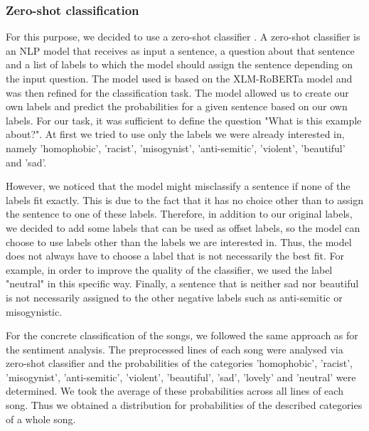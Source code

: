 \subsubsection*{Zero-shot classification}
For this purpose, we decided to use a zero-shot classifier \cite{zero-shot}. A zero-shot classifier is an NLP model that receives as input a sentence, a question about that sentence and a list of labels to which the model should assign the sentence depending on the input question. The model used is based on the XLM-RoBERTa model \cite{roberta} and was then refined for the classification task. The model allowed us to create our own labels and predict the probabilities for a given sentence based on our own labels. For our task, it was sufficient to define the question "What is this example about?". At first we tried to use only the labels we were already interested in, namely 'homophobic', 'racist', 'misogynist', 'anti-semitic', 'violent', 'beautiful' and 'sad'. 

However, we noticed that the model might misclassify a sentence if none of the labels fit exactly. This is due to the fact that it has no choice other than to assign the sentence to one of these labels. Therefore, in addition to our original labels, we decided to add some labels that can be used as offset labels, so the model can choose to use labels other than the labels we are interested in. Thus, the model does not always have to choose a label that is not necessarily the best fit. For example, in order to improve the quality of the classifier, we used the label "neutral" in this specific way. Finally, a sentence that is neither sad nor beautiful is not necessarily assigned to the other negative labels such as anti-semitic or misogynistic.

For the concrete classification of the songs, we followed the same approach as for the sentiment analysis. The preprocessed lines of each song were analysed via zero-shot classifier and the probabilities of the categories 'homophobic', 'racist', 'misogynist', 'anti-semitic', 'violent', 'beautiful', 'sad', 'lovely' and 'neutral' were determined. We took the average of these probabilities across all lines of each song. Thus we obtained a distribution for probabilities of the described categories of a whole song.

